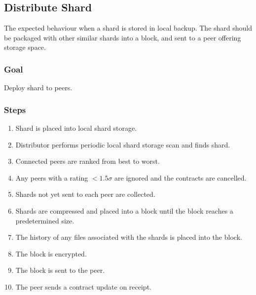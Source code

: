 \documentclass[11pt, a4paper, twocolumn, twoside]{report}
\begin{document}
\subsection{Distribute Shard}

The expected behaviour when a shard is stored in local backup. The shard should be packaged with other similar shards into a block, and sent to a peer offering storage space.

\subsubsection{Goal}

Deploy shard to peers.

\subsubsection{Steps}

\begin{enumerate}
 \item Shard is placed into local shard storage.
 \item Distributor performs periodic local shard storage scan and finds shard.
 \item Connected peers are ranked from best to worst.
 \item Any peers with a rating $<1.5 \sigma$ are ignored and the contracts are cancelled.
 \item Shards not yet sent to each peer are collected.
 \item Shards are compressed and placed into a block until the block reaches a predetermined size.
 \item The history of any files associated with the shards is placed into the block.
 \item The block is encrypted.
 \item The block is sent to the peer.
 \item The peer sends a contract update on receipt.
\end{enumerate}
\end{document}
